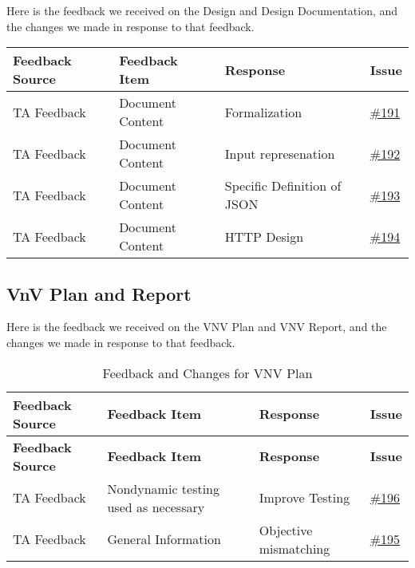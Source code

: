 \documentclass{article}
\begin{document}
Here is the feedback we received on the Design and Design Documentation, and the changes we made in response to that feedback.
\begin{longtable}{| p{} | p{} | p{} | p{} |}
\hline
\textbf{Feedback Source} & \textbf{Feedback Item} & \textbf{Response} & \textbf{Issue} \\
\hline
TA Feedback & Document Content & Formalization  & \href{https://github.com/RezaJodeiri/CXR-Capstone/issues/191}{\#191} \\
\hline
TA Feedback & Document Content & Input represenation & \href{https://github.com/RezaJodeiri/CXR-Capstone/issues/192}{\#192} \\
\hline
TA Feedback & Document Content & Specific Definition of JSON & \href{https://github.com/RezaJodeiri/CXR-Capstone/issues/193}{\#193} \\
\hline
TA Feedback & Document Content & HTTP Design & \href{https://github.com/RezaJodeiri/CXR-Capstone/issues/194}{\#194} \\
\hline
\end{longtable}

\subsection{VnV Plan and Report}

Here is the feedback we received on the VNV Plan and VNV  Report, and the changes we made in response to that feedback.

\begin{longtable}{| p{} | p{} | p{} | p{} |}
    \caption{Feedback and Changes for VNV Plan} \\
    \hline
    \textbf{Feedback Source} & \textbf{Feedback Item} & \textbf{Response} & \textbf{Issue} \\
    \hline
    \endfirsthead
    \hline
    \textbf{Feedback Source} & \textbf{Feedback Item} & \textbf{Response} & \textbf{Issue} \\
    \hline
    \endhead
    \hline
    \endfoot
    TA Feedback & Nondynamic testing used as necessary & Improve Testing & \href{https://github.com/RezaJodeiri/CXR-Capstone/issues/196}{\#196} \\
    \hline
    TA Feedback & General Information & Objective mismatching & \href{https://github.com/RezaJodeiri/CXR-Capstone/issues/195}{\#195} \\
    \hline

\end{longtable}
\end{document}
